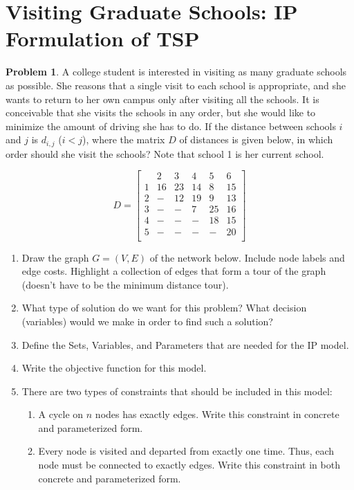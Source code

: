 \documentclass[11pt]{article}
\theoremstyle{definition}
\newtheorem{problem}{Problem}
\newcommand{\answerbox}[3]{%
  \fbox{%
    \begin{minipage}[#1]{#2}
      \hfill\vspace{#3}
    \end{minipage}
  }
}
\newcommand{\catbox}{\answerbox{c}{.5in}{.7cm}}
\begin{document}
\newpage

\section{Visiting Graduate Schools: IP Formulation of TSP}

\begin{problem}
A college student is interested in visiting as many graduate schools as possible.
She reasons that a single visit to each school is appropriate, and she wants to 
return to her own campus only after visiting all the schools.  It is conceivable that
she visits the schools in any order, but she would like to minimize the amount of
driving she has to do.  If the distance between schools $i$ and $j$ is $d_{i,j}$ ($i < j$), where the 
matrix $D$ of distances is given below, in which order should she visit the schools?
Note that school 1 is her current school.

\[
D = \left[
\begin{array}{c|ccccc}
& 2 & 3 & 4 & 5 & 6 \\
\hline
1 & 16 & 23 & 14 & 8 & 15 \\
2 & - & 12 & 19 & 9 & 13 \\
3 & - & - & 7 & 25 & 16 \\
4 & - & - & - & 18 & 15 \\
5 & - & - & - & - & 20 \\
\end{array}
\right]
\]

\begin{enumerate}[resume]
\item Draw the graph $G = (V,E)$ of the network below.  Include node labels and edge costs.  Highlight a collection of edges that form a tour of the graph (doesn't have to be the minimum distance tour).

\vfill


\item What type of solution do we want for this problem? What decision (variables) would we make in order to find such a solution? \vfill

\newpage

\item Define the Sets, Variables, and Parameters that are needed for the IP model. 
\vfill 

\item Write the objective function for this model. \vspace{1.25in}

\item There are two types of constraints that should be included in this model:
	\begin{enumerate}
	\item A cycle on $n$ nodes has exactly \catbox edges. Write this constraint in concrete and parameterized form. \vfill
	\item Every node is visited and departed from exactly one time. Thus, each node must be connected to exactly \catbox edges. Write this constraint in both concrete and parameterized form. \vfill
	\end{enumerate}
\end{enumerate}



\end{problem}
\end{document}
